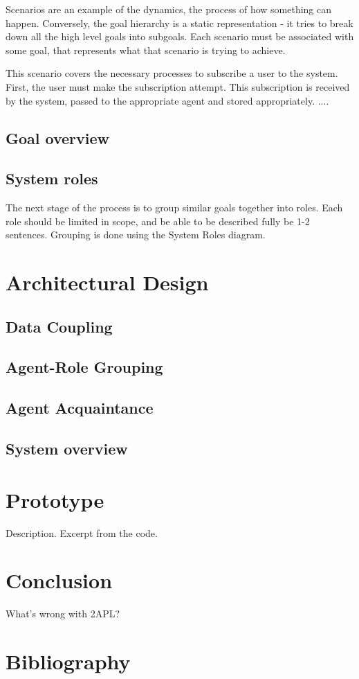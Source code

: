 \documentclass[a4paper]{article}
\begin{document}
Scenarios are an example of the dynamics, the process of how something can happen. Conversely, the goal hierarchy is a static representation  - it tries to break down all the high level goals into subgoals. Each scenario must be associated with some goal, that represents what that scenario is trying to achieve. 


This scenario covers the necessary processes to subscribe a user to the system. First, the user must make the subscription attempt. This subscription is received by the system, passed to the appropriate agent and stored appropriately. ....

\subsection{Goal overview}

\subsection{System roles}
The next stage of the process is to group similar goals together into roles. Each role should be limited in scope, and be able to be described fully be 1-2 sentences. Grouping is done using the System Roles diagram. 

\section{Architectural Design}\label{sec:design} 

\subsection{Data Coupling}

\subsection{Agent-Role Grouping}

\subsection{Agent Acquaintance}

\subsection{System overview}

\section{Prototype}\label{sec:proto} 

Description. Excerpt from the code.

\section{Conclusion}\label{sec:concl} 

What's wrong with 2APL?

\section{Bibliography}
\nocite{*}


\end{document}
